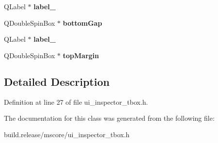 \begin{DoxyCompactItemize}
Q\+Label $\ast$ {\bfseries label\+\_}
\item 
\mbox{\label{class_ui___inspector_t_box_a9eb500fe3276b3732831f4b10a893688}} 
Q\+Double\+Spin\+Box $\ast$ {\bfseries bottom\+Gap}
\item 
\mbox{\label{class_ui___inspector_t_box_ac8505de7f3a3e68fd56126d435822fdb}} 
Q\+Label $\ast$ {\bfseries label\+\_}
\item 
\mbox{\label{class_ui___inspector_t_box_a1c28cbb7826179fbda57f0709f7d703a}} 
Q\+Double\+Spin\+Box $\ast$ {\bfseries top\+Margin}
\end{DoxyCompactItemize}


\subsection{Detailed Description}


Definition at line 27 of file ui\+\_\+inspector\+\_\+tbox.\+h.



The documentation for this class was generated from the following file\+:\begin{DoxyCompactItemize}
\item 
build.\+release/mscore/ui\+\_\+inspector\+\_\+tbox.\+h\end{DoxyCompactItemize}
